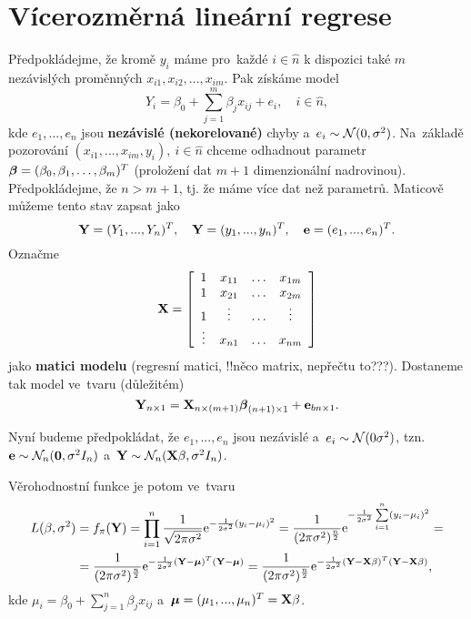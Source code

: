 \chapter{Vícerozměrná lineární regrese}

Předpokládejme, že kromě $y_i$ máme pro~každé $i\in\hat{n}$ k dispozici také $m$ nezávislých proměnných $x_{i1},x_{i2},...,x_{im}$. Pak získáme model
$$ Y_i=\beta_0+\sum_{j=1}^m \beta_j x_{ij}+e_i,\quad i\in\hat{n},$$
kde $e_1,...,e_n$ jsou \textbf{nezávislé (nekorelované)} chyby a~$e_i\sim\mathcal{N}(0,\sigma^2)$. Na~základě pozorování $(x_{i1},...,x_{im},y_i),~i\in\hat{n}$ chceme odhadnout parametr $\boldsymbol{\beta}=(\beta_0,\beta_1,\dots,\beta_m)^T$ (proložení dat $m+1$ dimenzionální nadrovinou). Předpokládejme, že $n>m+1$, tj. že máme více dat než parametrů. Maticově můžeme tento stav zapsat jako
$$ \textbf{Y}=(Y_1,...,Y_n)^T,\quad \textbf{Y}=(y_1,...,y_n)^T,\quad \textbf{e}=(e_1,...,e_n)^T.$$
Označme 
$$ \textbf{X}=\left[ \begin{array}{cccc}
1 & x_{11} & \dots & x_{1m} \\
1 & x_{21} & \dots & x_{2m} \\
1 & \vdots & \dots & \vdots \\
 \vdots& x_{n1} & \dots & x_{nm} 
\end{array}
 \right]$$ jako \textbf{matici modelu} (regresní matici, !!něco matrix, nepřečtu to???). Dostaneme tak model ve~tvaru (důležitém)
  \begin{equation}\label{the_chosen_one}
 \textbf{Y}_{n\times 1}=\textbf{X}_{n\times(m+1)}\boldsymbol{\beta}_{(n+1)\times 1}+\textbf{e}_{bn\times 1}.
 \end{equation}
 
 Nyní budeme předpokládat, že $e_1,...,e_n$ jsou nezávislé a~$e_i \sim\mathcal{N}(0\sigma^2)$, tzn. $\textbf{e}\sim\mathcal{N}_n(\textbf{0},\sigma^2 I_n)$ a~$\textbf{Y}\sim\mathcal{N}_n(\textbf{X}\beta,\sigma^2 I_n)$. 
 
 Věrohodnostní funkce je potom ve~tvaru 
 \begin{align*}
 L(\beta,\sigma^2)&=f_\pi(\textbf{Y})=\prod_{i=1}^n \frac{1}{\sqrt{2\pi\sigma^2}}\mathrm{e}^{-\frac{1}{2\sigma^2}(y_i-\mu_i)^2}=\frac{1}{(2\pi\sigma^2)^{\frac{n}{2}}}\mathrm{e}^{-\frac{1}{2\sigma^2}\sum\limits_{i=1}^{n} (y_i-\mu_i)^2}= \\ &=\frac{1}{(2\pi\sigma^2)^{\frac{n}{2}}}\mathrm{e}^{-\frac{1}{2\sigma^2}(\textbf{Y}-\boldsymbol{\mu})^T(\textbf{Y}-\boldsymbol{\mu})}=\frac{1}{(2\pi\sigma^2)^{\frac{n}{2}}}\mathrm{e}^{-\frac{1}{2\sigma^2}(\textbf{Y}-\textbf{X}\beta)^T(\textbf{Y}-\textbf{X}\beta)},
 \end{align*}
kde $\mu_i=\beta_0+\sum_{j=1}^n \beta_j x_{ij}$ a~$\boldsymbol{\mu}=(\mu_1,...,\mu_n)^T=\textbf{X}\beta$.
 
